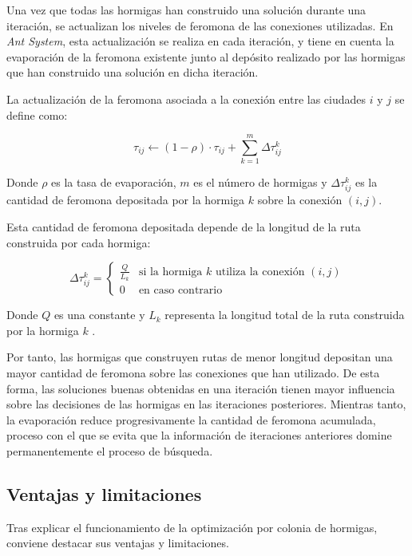Una vez que todas las hormigas han construido una solución durante una iteración, se actualizan los niveles de feromona
de las conexiones utilizadas. En \textit{Ant System}, esta actualización se realiza en cada iteración, y tiene en cuenta
la evaporación de la feromona existente junto al depósito realizado por las hormigas que han construido una solución en
dicha iteración.

La actualización de la feromona asociada a la conexión entre las ciudades $i$ y $j$ se define como:

\begin{equation}
\tau_{ij} \leftarrow (1-\rho) \cdot \tau_{ij} + \sum_{k=1}^{m}\Delta\tau_{ij}^{k}
\end{equation}

Donde $\rho$ es la tasa de evaporación, $m$ es el número de hormigas y $\Delta\tau_{ij}^{k}$ es la cantidad de feromona
depositada por la hormiga $k$ sobre la conexión $(i, j)$. 

Esta cantidad de feromona depositada depende de la longitud de la ruta construida por cada hormiga:

\begin{equation}
\Delta\tau_{ij}^{k} =
\begin{cases}
\frac{Q}{L_k} & \text{si la hormiga } k \text{ utiliza la conexión } (i,j)\\
0 & \text{en caso contrario}
\end{cases}
\end{equation}

Donde $Q$ es una constante y $L_k$ representa la longitud total de la ruta construida por la hormiga $k$ \cite{dorigo2006}.

Por tanto, las hormigas que construyen rutas de menor longitud depositan una mayor cantidad de feromona sobre las
conexiones que han utilizado. De esta forma, las soluciones buenas obtenidas en una iteración tienen mayor influencia 
sobre las decisiones de las hormigas en las iteraciones posteriores. Mientras tanto, la evaporación reduce progresivamente
la cantidad de feromona acumulada, proceso con el que se evita que la información de iteraciones anteriores domine 
permanentemente el proceso de búsqueda.

\subsection{Ventajas y limitaciones}
\label{subsec:aco_proscons}

Tras explicar el funcionamiento de la optimización por colonia de hormigas, conviene destacar sus ventajas y limitaciones. 


